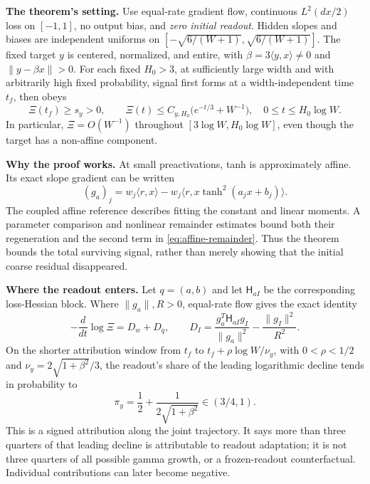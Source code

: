 \documentclass[10pt]{article}
\begin{document}
\textbf{The theorem's setting.}
Use equal-rate gradient flow, continuous $L^2(dx/2)$ loss on $[-1,1]$,
no output bias, and \emph{zero initial readout}.
Hidden slopes and biases are independent uniforms on
$[-\sqrt{6/(W+1)},\sqrt{6/(W+1)}]$.
The fixed target $y$ is centered, normalized, and entire, with
$\beta=3\langle y,x\rangle\ne0$ and $\|y-\beta x\|>0$.
For each fixed $H_0>3$, at sufficiently large width and with arbitrarily high
fixed probability, signal first forms at a width-independent time $t_f$,
then obeys
\begin{equation}\label{eq:depletion}
 \Xi(t_f)\ge s_y>0,\qquad
 \Xi(t)\le C_{y,H_0}\bigl(e^{-t/3}+W^{-1}\bigr),
 \quad 0\le t\le H_0\log W.
\end{equation}
In particular, $\Xi=O(W^{-1})$ throughout
$[3\log W,H_0\log W]$, even though the target has a non-affine component.

\textbf{Why the proof works.}
At small preactivations, tanh is approximately affine. Its exact slope
gradient can be written
\begin{equation}\label{eq:affine-remainder}
 (g_a)_j=w_j\langle r,x\rangle
 -w_j\langle r,x\tanh^2(a_jx+b_j)\rangle.
\end{equation}
The coupled affine reference describes fitting the constant and linear
moments. A parameter comparison and nonlinear remainder estimates bound both
their regeneration and the second term in \eqref{eq:affine-remainder}.
Thus the theorem bounds the total surviving signal, rather than merely
showing that the initial coarse residual disappeared.

\textbf{Where the readout enters.}
Let $q=(a,b)$ and let $\mathsf H_{aI}$ be the corresponding loss-Hessian block.
Where $\|g_a\|,R>0$, equal-rate flow gives the exact identity
\begin{equation}\label{eq:attribution}
 -\frac{d}{dt}\log\Xi=D_w+D_q,\qquad
 D_I=\frac{g_a^T\mathsf H_{aI}g_I}{\|g_a\|^2}
       -\frac{\|g_I\|^2}{R^2}.
\end{equation}
On the shorter attribution window from $t_f$ to
$t_f+\rho\log W/\nu_y$, with $0<\rho<1/2$ and
$\nu_y=2\sqrt{1+\beta^2}/3$, the readout's share
of the leading logarithmic decline tends in probability to
\begin{equation}\label{eq:share}
 \pi_y=\frac12+\frac{1}{2\sqrt{1+\beta^2}}\in(3/4,1).
\end{equation}
This is a signed attribution along the joint trajectory. It says more than
three quarters of that leading decline is attributable to readout adaptation;
it is not three quarters of all possible gamma growth, or a frozen-readout
counterfactual. Individual contributions can later become negative.
\end{document}
